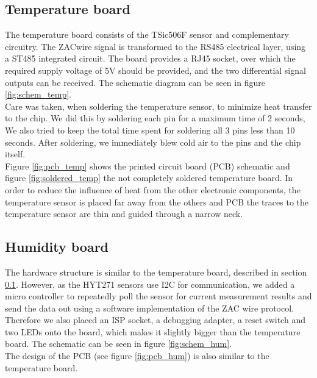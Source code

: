 \documentclass[a4paper]{scrreprt}
\begin{document}
\subsection{Temperature board} \label{chap:tempbrd}
The temperature board consists of the TSic506F sensor and
complementary circuitry. The ZACwire signal is transformed to the
RS485 electrical layer, using a ST485 integrated circuit. The board
provides a RJ45 socket,  over which the required supply voltage of 5V
should be provided, and the two differential signal outputs can be
received. The schematic diagram can be seen in figure
\ref{fig:schem_temp}.\\
Care was taken, when soldering the temperature sensor, to minimize
heat transfer to the chip. We did this by soldering each pin for a
maximum time of 2 seconds, We also tried to keep the total time spent
for soldering all 3 pins less than 10 seconds. After soldering, we
immediately blew cold air to the pins and the chip itself.\\
Figure \ref{fig:pcb_temp} shows the printed circuit board (PCB) schematic
and figure \ref{fig:soldered_temp} the not completely soldered
temperature board. 
In order to reduce the influence of heat from the other electronic
components, the temperature sensor is placed far away from the others
and PCB the traces to the temperature sensor are thin and guided through
a narrow neck.
\subsection{Humidity board}
The hardware structure is similar to the temperature board, described in section \ref{chap:tempbrd}. However, as the HYT271 sensors use I2C for
communication, we added a micro controller to repeatedly poll the sensor for current measurement results and send the data out using a software
implementation of the ZAC wire protocol. Therefore we also placed an ISP socket, a debugging adapter, a reset switch and two LEDs onto the board, which makes it
slightly bigger than the temperature board. The schematic can be seen in figure \ref{fig:schem_hum}.\\
The design of the PCB (see figure \ref{fig:pcb_hum}) is also similar to the temperature board. 
\end{document}
